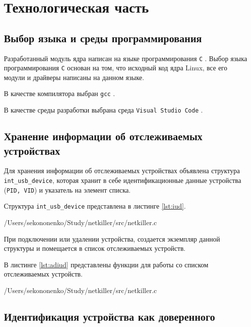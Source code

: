 \chapter{Технологическая часть}

\section{Выбор языка и среды программирования}

Разработанный модуль ядра написан на языке программирования \texttt{C} \cite{c-language}. Выбор языка программирования \texttt{С} основан на том, что исходный код ядра Linux, все его модули и драйверы написаны на данном языке.

В качестве компилятора выбран \texttt{gcc} \cite{gcc}.

В качестве среды разработки выбрана среда \texttt{Visual Studio Code} \cite{vscode}.

\section{Хранение информации об отслеживаемых устройствах}

Для хранения информации об отслеживаемых устройствах объявлена структура \texttt{int\_usb\_device}, которая хранит в себе идентификационные данные устройства (\texttt{PID, VID}) и указатель на элемент списка.

Структура \texttt{int\_usb\_device} представлена в листинге \ref{lst:iud}.

\begin{lstinputlisting}[
	caption={Структура \texttt{int\_usb\_device}},
	label={lst:iud},
	style={c},
	linerange={9-13},
	]{/Users/sekononenko/Study/netkiller/src/netkiller.c}
\end{lstinputlisting}

При подключении или удалении устройства, создается экземпляр данной структуры и помещается в список отслеживаемых устройств.

В листинге \ref{lst:adiud} представлены функции для работы со списком отслеживаемых устройств.

\begin{lstinputlisting}[
	caption={Функции для работы со списком отслеживаемых устройств},
	label={lst:adiud},
	style={c},
	linerange={81-102},
	]{/Users/sekononenko/Study/netkiller/src/netkiller.c}
\end{lstinputlisting}

\section{Идентификация устройства как доверенного}

